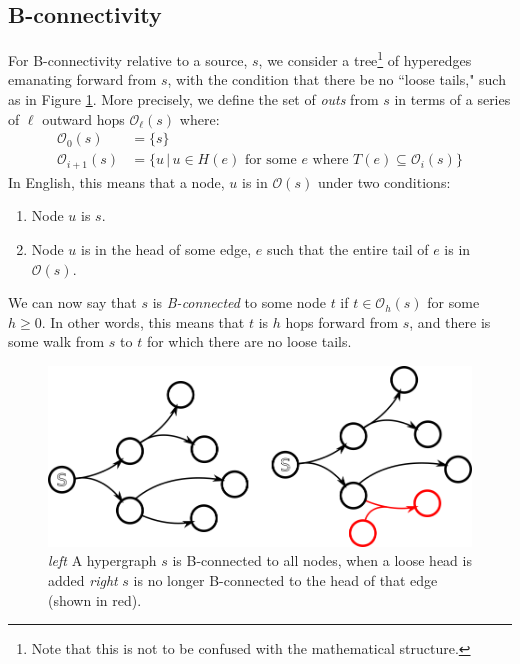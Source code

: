 \documentclass[12pt,twoside]{reedthesis}
\theoremstyle{definition}
\begin{document}
\subsection{B-connectivity}
For B-connectivity relative to a source, $s$, we consider a tree\footnote{Note that this is not to be confused with the mathematical structure.} of hyperedges emanating forward from $s$, with the condition that there be no ``loose tails," such as in Figure \ref{fig:B-Hypergraph}. More precisely, we define the set of \textit{outs} from $s$ in terms of a series of $\ell$ outward hops $\mathcal{O}_\ell(s)$ where:
\begin{align*}
  \mathcal{O}_0(s)&=\{s\}\\
  \mathcal{O}_{i+1}(s)&=\{u \,|\, u \in H(e) \text{ for some } e \text{ where } T(e) \subseteq \mathcal{O}_i(s)\}
\end{align*}
In English, this means that a node, $u$ is in $\mathcal{O}(s)$ under two conditions:
\begin{enumerate}
  \item{Node $u$ is $s$.}
  \item{Node $u$ is in the head of some edge, $e$ such that the entire tail of $e$ is in $\mathcal{O}(s)$.}
\end{enumerate}
We can now say that $s$ is \textit{B-connected} to some node $t$ if $t \in \mathcal{O}_h(s)$ for some $h \geq 0$. In other words, this means that $t$ is $h$ hops forward from $s$, and there is some walk from $s$ to $t$ for which there are no loose tails.\par

\begin{figure}[h]
  \begin{center}
    \includegraphics[width=\textwidth]{B-hypergraph}
  \caption[B-connectivity.]{\textit{left }A hypergraph $s$ is B-connected to all nodes, when a loose head is added \textit{right} $s$ is no longer B-connected to the head of that edge (shown in red).}
  \label{fig:B-Hypergraph}
  \end{center}
\end{figure}
\end{document}
